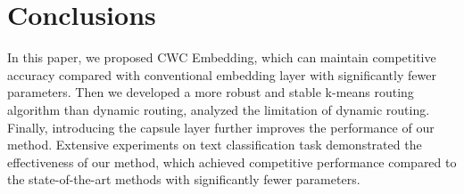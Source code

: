 \documentclass[times,twocolumn,final]{elsarticle}
\begin{document}
\section{Conclusions}

In this paper, we proposed CWC Embedding, which can maintain competitive accuracy compared with conventional embedding layer with significantly fewer parameters. Then we developed a more robust and stable k-means routing algorithm than dynamic routing, analyzed the limitation of dynamic routing. Finally, introducing the capsule layer further improves the performance of our method. Extensive experiments on text classification task demonstrated the effectiveness of our method, which achieved competitive performance compared to the state-of-the-art methods with significantly fewer parameters.



\end{document}
